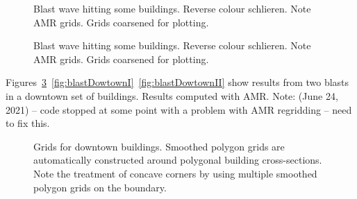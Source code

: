 {
\begin{figure}[htb]
\begin{center}
\end{center}
  \caption{Blast wave hitting some buildings. 
    Reverse colour schlieren. Note AMR grids. Grids coarsened for plotting. 
  }
  \label{fig:blastBuildingsSchlieren}
\end{figure}
}

{
\begin{figure}[htb]
\begin{center}
\end{center}
  \caption{Blast wave hitting some buildings. 
    Reverse colour schlieren. Note AMR grids. Grids coarsened for plotting. 
  }
  \label{fig:blastBuildingsSchlieren}
\end{figure}
}


Figures~\ref{fig:blastDowntownGrid}~\ref{fig:blastDowtownI}~\ref{fig:blastDowtownII}
show results from two blasts in a downtown set of buildings. Results computed
with AMR. Note: (June 24, 2021) -- code stopped at some point with a problem with AMR regridding -- 
need to fix this.

{
\begin{figure}[htb]
\begin{center}
\end{center}
  \caption{Grids for downtown buildings. Smoothed polygon grids are automatically constructed around polygonal building cross-sections.
     Note the treatment of concave corners by using multiple smoothed polygon grids on the boundary.}
  \label{fig:blastDowntownGrid}
\end{figure}
}



